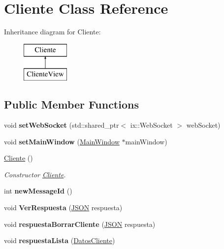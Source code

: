 \hypertarget{classCliente}{}\section{Cliente Class Reference}
\label{classCliente}
Inheritance diagram for Cliente\+:\begin{figure}[H]
\begin{center}
\leavevmode
\includegraphics[height=2.000000cm]{classCliente}
\end{center}
\end{figure}
\subsection*{Public Member Functions}
\begin{DoxyCompactItemize}
\item 
\mbox{\label{classCliente_ac0a99cb961dc4a842b88df8810e9bbcf}} 
void {\bfseries set\+Web\+Socket} (std\+::shared\+\_\+ptr$<$ ix\+::\+Web\+Socket $>$ web\+Socket)
\item 
\mbox{\label{classCliente_a48fea4eaf979c44741fa7104a29385e7}} 
void {\bfseries set\+Main\+Window} (\mbox{\hyperlink{classMainWindow}{Main\+Window}} $\ast$main\+Window)
\item 
\mbox{\label{classCliente_ab6a372f412692c12c4be4427b00a3f6e}} 
\mbox{\hyperlink{classCliente_ab6a372f412692c12c4be4427b00a3f6e}{Cliente}} ()
\begin{DoxyCompactList}\small\item\em Constructor \mbox{\hyperlink{classCliente}{Cliente}}. \end{DoxyCompactList}\item 
\mbox{\label{classCliente_addca42ad4fc158cbe1fd51d206a0523f}} 
int {\bfseries new\+Message\+Id} ()
\item 
\mbox{\label{classCliente_aad40988f336462348748f7a5745b1a8c}} 
void {\bfseries Ver\+Respuesta} (\mbox{\hyperlink{cliente_8cpp_ab6104b89642419db4e355b7b2e40abbe}{J\+S\+ON}} respuesta)
\item 
\mbox{\label{classCliente_afe9b5fc4aafb8410ca9d80dd0f303661}} 
void {\bfseries respuesta\+Borrar\+Cliente} (\mbox{\hyperlink{cliente_8cpp_ab6104b89642419db4e355b7b2e40abbe}{J\+S\+ON}} respuesta)
\item 
\mbox{\label{classCliente_aa6e1db9ce56d9ba3395df66819439893}} 
void {\bfseries respuesta\+Lista} (\mbox{\hyperlink{structDatosCliente}{Datos\+Cliente}})
\end{DoxyCompactItemize}
